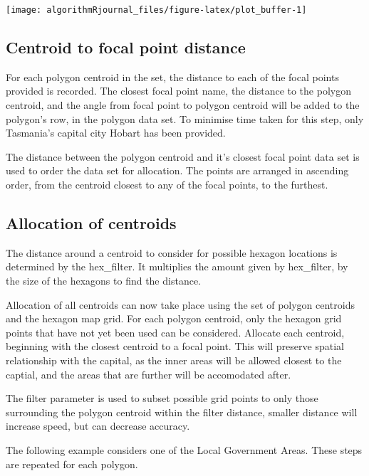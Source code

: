 \begin{Schunk}

\texttt{[image: algorithmRjournal\_files/figure-latex/plot\_buffer-1]} \end{Schunk}

\hypertarget{centroid-to-focal-point-distance}{%
\subsection{Centroid to focal point
distance}\label{centroid-to-focal-point-distance}}

For each polygon centroid in the set, the distance to each of the focal
points provided is recorded. The closest focal point name, the distance
to the polygon centroid, and the angle from focal point to polygon
centroid will be added to the polygon's row, in the polygon data set. To
minimise time taken for this step, only Tasmania's capital city Hobart
has been provided.

The distance between the polygon centroid and it's closest focal point
data set is used to order the data set for allocation. The points are
arranged in ascending order, from the centroid closest to any of the
focal points, to the furthest.

\hypertarget{allocation-of-centroids}{%
\subsection{Allocation of centroids}\label{allocation-of-centroids}}

The distance around a centroid to consider for possible hexagon
locations is determined by the hex\_filter. It multiplies the amount
given by hex\_filter, by the size of the hexagons to find the distance.

Allocation of all centroids can now take place using the set of polygon
centroids and the hexagon map grid. For each polygon centroid, only the
hexagon grid points that have not yet been used can be considered.
Allocate each centroid, beginning with the closest centroid to a focal
point. This will preserve spatial relationship with the capital, as the
inner areas will be allowed closest to the captial, and the areas that
are further will be accomodated after.

The filter parameter is used to subset possible grid points to only
those surrounding the polygon centroid within the filter distance,
smaller distance will increase speed, but can decrease accuracy.

The following example considers one of the Local Government Areas. These
steps are repeated for each polygon.

